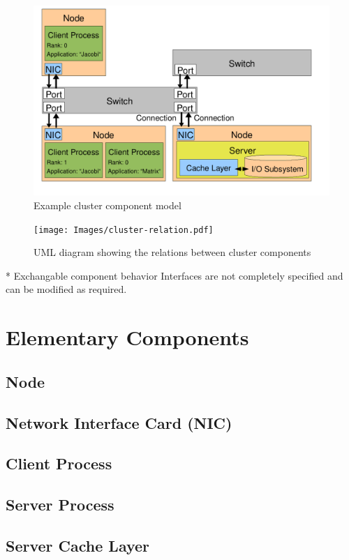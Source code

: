 \documentclass[
     11pt,         %
     a4paper,      %
     BCOR10mm,     %
     DIV14,        %
     liststotoc,   %
     bibtotoc,     %
     idxtotoc,     %
     parskip       %
     ]{scrreprt}   %
\begin{document}
\begin{figure}%
  \centering
\includegraphics[scale=0.75]{Images/cluster-model.pdf}
    \caption{Example cluster component model}
    \label{fig:cluster-model}
\end{figure}

\begin{figure}
  \centering
\texttt{[image: Images/cluster-relation.pdf]}
    \caption{UML diagram showing the relations between cluster components}
    \label{fig:cluster-relation}
\end{figure}


* Exchangable component behavior
  Interfaces are not completely specified and can be modified as required.

\section{Elementary Components}
\subsection{Node}
\subsection{Network Interface Card (NIC)}
\subsection{Client Process}
\subsection{Server Process}
\subsection{Server Cache Layer}
\end{document}
